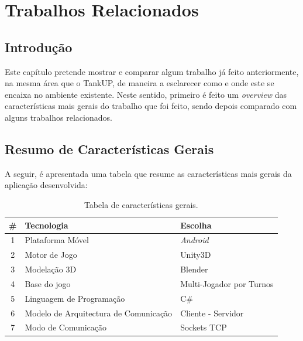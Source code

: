 \chapter{Trabalhos Relacionados}
\label{chap:relacionados}

\section{Introdução}
\label{chap2:sec:intro}
Este capítulo pretende mostrar e comparar algum trabalho já feito anteriormente, na mesma área que o TankUP, de maneira a esclarecer como e onde este se encaixa no ambiente existente. Neste sentido, primeiro é feito um \textit{overview} das características mais gerais do trabalho que foi feito, sendo depois comparado com alguns trabalhos relacionados.

\section{Resumo de Características Gerais}
\label{chap2:sec:DGL}
A seguir, é apresentada uma tabela que resume as características mais gerais da aplicação desenvolvida:
\begin{table}
\caption{Tabela de características gerais.}
\label{tab:tabela_caracteristicas_gerais}
\centering
\begin{tabular}{|c||l|l|}
\hline
\hline
\textbf{\#} & \textbf{Tecnologia} & \textbf{Escolha} \\
\hline
\hline
1 & Plataforma Móvel & \emph{Android} \\
\hline	
2 & Motor de Jogo & Unity3D \\
\hline
3 & Modelação 3D  & Blender\\
\hline
4 & Base do jogo &  Multi-Jogador por Turnos\\
\hline
5 & Linguagem de Programação & C\#\\
\hline
6 & Modelo de Arquitectura de Comunicação & Cliente - Servidor\\
\hline
7 & Modo de Comunicação & Sockets \ac{TCP}\\
\hline
\end{tabular}

\end{table}
\clearpage

